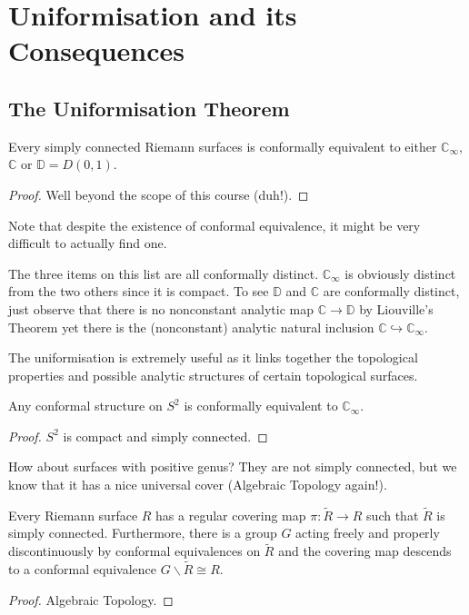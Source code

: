 \section{Uniformisation and its Consequences}
\subsection{The Uniformisation Theorem}
\begin{theorem}
    Every simply connected Riemann surfaces is conformally equivalent to either $\mathbb C_\infty$, $\mathbb C$ or $\mathbb D=D(0,1)$.
\end{theorem}
\begin{proof}
    Well beyond the scope of this course (duh!).
\end{proof}
Note that despite the existence of conformal equivalence, it might be very difficult to actually find one.
\begin{remark}
    The three items on this list are all conformally distinct.
    $\mathbb C_\infty$ is obviously distinct from the two others since it is compact.
    To see $\mathbb D$ and $\mathbb C$ are conformally distinct, just observe that there is no nonconstant analytic map $\mathbb C\to\mathbb D$ by Liouville's Theorem yet there is the (nonconstant) analytic natural inclusion $\mathbb C\hookrightarrow\mathbb C_\infty$.
\end{remark}
The uniformisation is extremely useful as it links together the topological properties and possible analytic structures of certain topological surfaces.
\begin{corollary}
    Any conformal structure on $S^2$ is conformally equivalent to $\mathbb C_\infty$.
\end{corollary}
\begin{proof}
    $S^2$ is compact and simply connected.
\end{proof}
How about surfaces with positive genus?
They are not simply connected, but we know that it has a nice universal cover (Algebraic Topology again!).
\begin{theorem}
    Every Riemann surface $R$ has a regular covering map $\pi:\tilde{R}\to R$ such that $\tilde{R}$ is simply connected.
    Furthermore, there is a group $G$ acting freely and properly discontinuously by conformal equivalences on $\tilde{R}$ and the covering map descends to a conformal equivalence $G\backslash\tilde{R}\cong R$.
\end{theorem}
\begin{proof}
    Algebraic Topology.
\end{proof}
